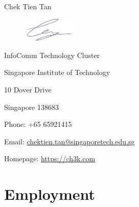 \documentclass[10pt,a4paper]{article}
\def\name{Chek Tien Tan}
\begin{document}
{\huge \name}

\begin{figure}[h!]
    \includegraphics[width=1in]{signature}
\end{figure}



\begin{minipage}[t]{0.5\textwidth}
    InfoComm Technology Cluster

    Singapore Institute of Technology

    10 Dover Drive

    Singapore 138683
\end{minipage}

\begin{minipage}[t]{0.5\textwidth}
  Phone: +65 65921415

  Email: \href{mailto:chektien.tan@singaporetech.edu.sg}{chektien.tan@singaporetech.edu.sg}

  Homepage: \href{http://ch3k.com}{https://ch3k.com}
\end{minipage}

\section*{Employment}
\end{document}
